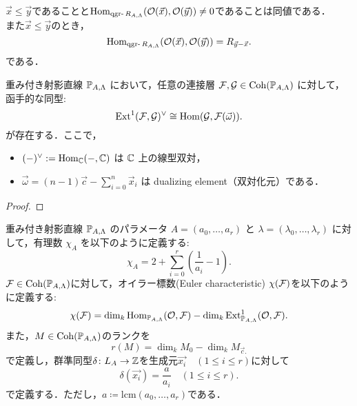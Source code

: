 \begin{prop}\label{lemm:qgr-hom-condition}
	$\vec{x}\le \vec{y}$であることと$\Hom_{\qgr R_{A,\Lambda}}(\mathcal{O}(\vec{x}),\mathcal{O}(\vec{y})) \neq 0$であることは同値である．\\
	また$\vec{x}\le\vec{y}$のとき，
	\[\Hom_{\qgr R_{A,\Lambda}}(\mathcal{O}(\vec{x}),\mathcal{O}(\vec{y}))= R_{\vec{y}- \vec{x}}.\]
	である．
\end{prop}

\begin{thm}\cite{GL87}
	重み付き射影直線 ${\mathbb P}_{A,\Lambda}$ において，任意の連接層 $\mathcal{F}, \mathcal{G} \in \operatorname{\mathrm{Coh}}({\mathbb P}_{A,\Lambda})$ に対して，函手的な同型:
\[
\operatorname{\mathrm{Ext}}^1(\mathcal{F}, \mathcal{G})^\vee \cong \operatorname{\mathrm{Hom}}(\mathcal{G}, \mathcal{F}(\vec{\omega})).
\]
が存在する．ここで，
\begin{itemize}
	\item $(-)^\vee := \operatorname{\mathrm{Hom}}_{{\mathbb C}}(-, {\mathbb C})$ は ${\mathbb C}$ 上の線型双対，
  \item $\vec{\omega} = (n - 1)\vec{c} - \sum_{i=0}^n \vec{x}_i$ は dualizing element（双対化元）である．
\end{itemize}
\end{thm}
\begin{proof}
	
\end{proof}

\begin{defn}
	重み付き射影直線 ${\mathbb P}_{A,\Lambda}$ のパラメータ $A = (a_0, \dots, a_r)$ と $\lambda = (\lambda_0, \dots, \lambda_r)$ に対して，有理数 $\chi_A$ を以下のように定義する:
\[\chi_A = 2 + \sum_{i=0}^{r} \left( \frac{1}{a_i} - 1\right) .\]
${\mathcal F}\in\operatorname{\mathrm{Coh}}({\mathbb P}_{A,\Lambda})$に対して，オイラー標数(Euler characteristic) $\chi({\mathcal F})$を以下のように定義する:
\[ \chi(\mathcal{F}) = \dim_k \operatorname{\mathrm{Hom}}_{{\mathbb P}_{A,\Lambda}}(\mathcal{O}, \mathcal{F}) - \dim_k \operatorname{\mathrm{Ext}}^1_{{\mathbb P}_{A,\Lambda}}(\mathcal{O}, \mathcal{F}) .\]
また，$M\in\operatorname{\mathrm{Coh}}({\mathbb P}_{A,\Lambda})$のランクを
\[r(M) = \dim_k M_{0} - \dim_k M_{\vec{c}.}\]
 で定義し，群準同型$\delta\colon L_A\to {\mathbb Z}$を生成元$\vec{x_i}\quad (1\le i \le r)$に対して
\[\delta(\vec{x_i}) = \frac{a}{a_i}\quad (1\le i\le r).\]
で定義する．ただし，$a\coloneq \text{lcm}(a_0,\ldots ,a_r)$である．
\end{defn}

